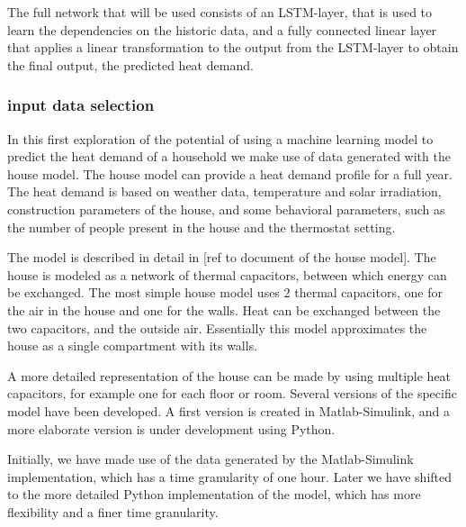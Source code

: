 The full network that will be used consists of an LSTM-layer, that is used to learn the dependencies on the historic data, and a fully connected linear layer that applies a linear transformation to the output from the LSTM-layer to obtain the final output, the predicted heat demand. 



\subsubsection{input data selection}

In this first exploration of the potential of using a machine learning model to predict the heat demand of a household we make use of data generated with the house model. The house model can provide a heat demand profile for a full year. The heat demand is based on weather data, temperature and solar irradiation, construction parameters of the house, and some behavioral parameters, such as the number of people present in the house and the thermostat setting.   

The model is described in detail in [ref to document of the house model]. The house is modeled as a network of thermal capacitors, between which energy can be exchanged. The most simple house model uses 2 thermal capacitors, one for the air in the house and one for the walls. Heat can be exchanged between the two capacitors, and the outside air. Essentially this model approximates the house as a single compartment with its walls. 

A more detailed representation of the house can be made by using multiple heat capacitors, for example one for each floor or room.   
Several versions of the specific model have been developed. A first version is created in Matlab-Simulink, and a more elaborate version is under development using Python. 

Initially, we have made use of the data generated by the Matlab-Simulink implementation, which has a time granularity of one hour. Later we have shifted to the more detailed Python implementation of the model, which has more flexibility and a finer time granularity.

